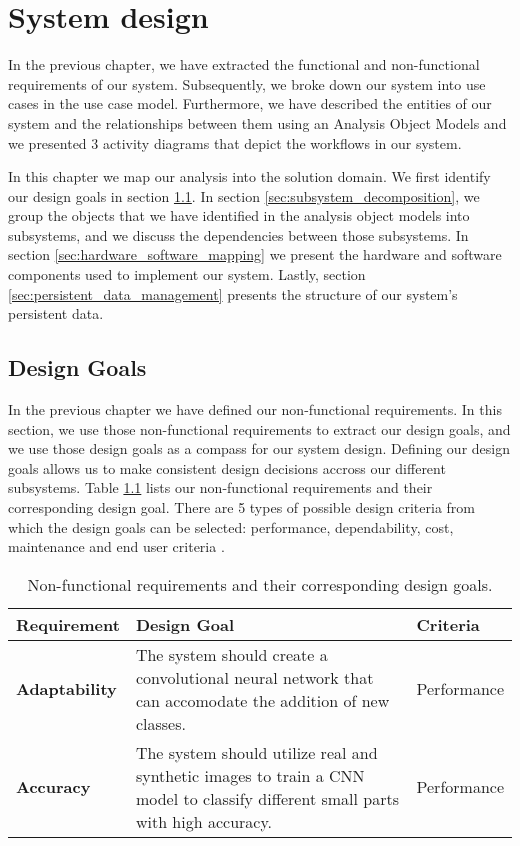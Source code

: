\chapter{System design}\label{ch:system_design}

In the previous chapter, we have extracted the functional and non-functional requirements of our system. Subsequently, we broke down our system into use cases in the use case model. Furthermore, we have described the entities of our system and the relationships between them using an Analysis Object Models and we presented 3 activity diagrams that depict the workflows in our system.

In this chapter we map our analysis into the solution domain. We first identify our design goals in section \ref{sec:design_goals}. In section \ref{sec:subsystem_decomposition}, we group the objects that we have identified in the analysis object models into subsystems, and we discuss the dependencies between those subsystems. In section \ref{sec:hardware_software_mapping} we present the hardware and software components used to implement our system. Lastly, section \ref{sec:persistent_data_management} presents the structure of our system's persistent data.


\section{Design Goals}\label{sec:design_goals}

In the previous chapter we have defined our non-functional requirements. In this section, we use those non-functional requirements to extract our design goals, and we use those design goals as a compass for our system design. Defining our design goals allows us to make consistent design decisions accross our different subsystems. Table \ref{tab:DG} lists our non-functional requirements and their corresponding design goal. There are 5 types of possible design criteria from which the design goals can be selected: performance, dependability, cost, maintenance and end user criteria \cite{bruegge2004object}.

\begin{table}
  \centering
  \begin{tabular}{ | l | p{5cm} | l | }
    \hline
    \textbf{Requirement} & \textbf{Design Goal} & \textbf{Criteria} \\ \hline
    \textbf{Adaptability} & The system should create a convolutional neural network that can accomodate the addition of new classes. & Performance \\ \hline
    \textbf{Accuracy} & The system should utilize real and synthetic images to train a CNN model to classify different small parts with high accuracy. & Performance \\ \hline
  \end{tabular}
  \caption{Non-functional requirements and their corresponding design goals.}
  \label{tab:DG}
\end{table}


